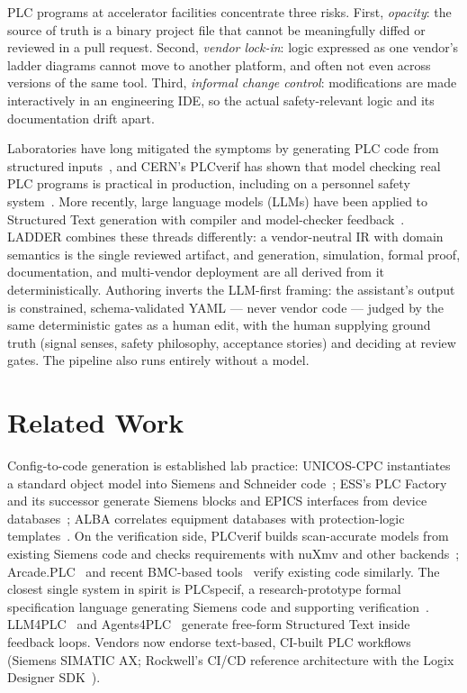 \documentclass[letterpaper]{jacow}
\begin{document}
PLC programs at accelerator facilities concentrate three risks. First,
\emph{opacity}: the source of truth is a binary project file that
cannot be meaningfully diffed or reviewed in a pull request. Second,
\emph{vendor lock-in}: logic expressed as one vendor's ladder diagrams
cannot move to another platform, and often not even across versions of
the same tool. Third, \emph{informal change control}: modifications are
made interactively in an engineering IDE, so the actual safety-relevant
logic and its documentation drift apart.

Laboratories have long mitigated the symptoms by generating PLC code
from structured inputs~\cite{unicos,plcfactory,pyplc}, and CERN's
PLCverif has shown that model checking real PLC programs is practical
in production, including on a personnel safety system~\cite{plcverif15,
plcverif-status}. More recently, large language models (LLMs) have been
applied to Structured Text generation with compiler and model-checker
feedback~\cite{llm4plc,agents4plc}. LADDER combines these threads
differently: a vendor-neutral IR with domain semantics is the single
reviewed artifact, and generation, simulation, formal proof,
documentation, and multi-vendor deployment are all derived from it
deterministically. Authoring inverts the LLM-first framing: the
assistant's output is constrained, schema-validated YAML --- never
vendor code --- judged by the same deterministic gates as a human
edit, with the human supplying ground truth (signal senses, safety
philosophy, acceptance stories) and deciding at review gates. The
pipeline also runs entirely without a model.

\section{Related Work}

Config-to-code generation is established lab practice: UNICOS-CPC
instantiates a standard object model into Siemens and Schneider
code~\cite{unicos}; ESS's PLC Factory and its successor generate
Siemens blocks and EPICS interfaces from device
databases~\cite{plcfactory}; ALBA correlates equipment databases with
protection-logic templates~\cite{pyplc}. On the verification side,
PLCverif builds scan-accurate models from existing Siemens code and
checks requirements with nuXmv and other backends~\cite{plcverif15,
plcverif-status}; Arcade.PLC~\cite{arcade} and recent BMC-based
tools~\cite{esbmcplc} verify existing code similarly. The closest
single system in spirit is PLCspecif, a research-prototype formal
specification language generating Siemens code and supporting
verification~\cite{plcspecif}. LLM4PLC~\cite{llm4plc} and
Agents4PLC~\cite{agents4plc} generate free-form Structured Text inside
feedback loops. Vendors now endorse text-based, CI-built PLC workflows
(Siemens SIMATIC AX; Rockwell's CI/CD reference architecture with the
Logix Designer SDK~\cite{at002}).
\end{document}
